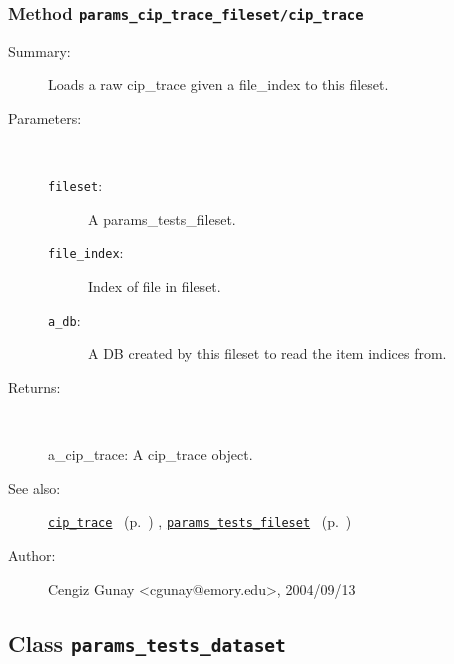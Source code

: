 \subsubsection[Method \texttt{cip\_trace}]{Method \texttt{params\_cip\_trace\_fileset/cip\_trace}}%
%
\label{ref_params_cip_trace_fileset__cip_trace}%
\hypertarget{ref_params_cip_trace_fileset__cip_trace}{}%
\begin{description}
\item[Summary:]Loads a raw cip\_trace given a file\_index to this fileset.
%
%
%
\item[Parameters:]~
\begin{description}%
\item[\texttt{fileset}:]
 A params\_tests\_fileset.
\item[\texttt{file\_index}:]
 Index of file in fileset.
\item[\texttt{a\_db}:]
 A DB created by this fileset to read the item indices from.
\end{description}%
%
\item[Returns:]~

	a\_cip\_trace: A cip\_trace object.
%
%
\item[See also:]%
\hyperlink{ref_cip_trace}{\texttt{cip\_trace}}%
\ (p.~\pageref{ref_cip_trace})%
%
, \hyperlink{ref_params_tests_fileset}{\texttt{params\_tests\_fileset}}%
\ (p.~\pageref{ref_params_tests_fileset})%
%
%
\item[Author:]%
Cengiz Gunay <cgunay@emory.edu>, 2004/09/13%
\end{description}
\methodline%
\subsection{Class \texttt{params\_tests\_dataset}}%
%
\label{ref_params_tests_dataset}%
\hypertarget{ref_params_tests_dataset}{}%
